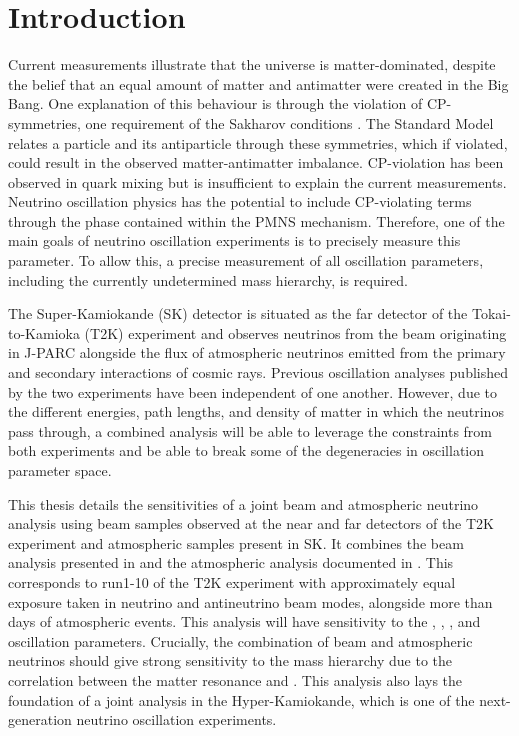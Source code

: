 \chapter{Introduction}
\label{chap:Introduction}

Current measurements illustrate that the universe is matter-dominated, despite the belief that an equal amount of matter and antimatter were created in the Big Bang. One explanation of this behaviour is through the violation of CP-symmetries, one requirement of the Sakharov conditions \cite{Sakharov1991}. The Standard Model relates a particle and its antiparticle through these symmetries, which if violated, could result in the observed matter-antimatter imbalance. CP-violation has been observed in quark mixing but is insufficient to explain the current measurements. Neutrino oscillation physics has the potential to include CP-violating terms through the  phase contained within the PMNS mechanism. Therefore, one of the main goals of neutrino oscillation experiments is to precisely measure this parameter. To allow this, a precise measurement of all oscillation parameters, including the currently undetermined mass hierarchy, is required.

The Super-Kamiokande (SK) detector is situated as the far detector of the Tokai-to-Kamioka (T2K) experiment and observes neutrinos from the beam originating in J-PARC alongside the flux of atmospheric neutrinos emitted from the primary and secondary interactions of cosmic rays. Previous oscillation analyses published by the two experiments have been independent of one another. However, due to the different energies, path lengths, and density of matter in which the neutrinos pass through, a combined analysis will be able to leverage the constraints from both experiments and be able to break some of the degeneracies in oscillation parameter space.

This thesis details the sensitivities of a joint beam and atmospheric neutrino analysis using beam samples observed at the near and far detectors of the T2K experiment and atmospheric samples present in SK. It combines the beam analysis presented in \cite{Dunne2020-uf} and the atmospheric analysis documented in \cite{Jiang2019-iw}. This corresponds to run1-10 of the T2K experiment with approximately equal exposure taken in neutrino and antineutrino beam modes, alongside more than  days of atmospheric events. This analysis will have sensitivity to the , , , and  oscillation parameters. Crucially, the combination of beam and atmospheric neutrinos should give strong sensitivity to the mass hierarchy due to the correlation between the matter resonance and . This analysis also lays the foundation of a joint analysis in the Hyper-Kamiokande, which is one of the next-generation neutrino oscillation experiments.

